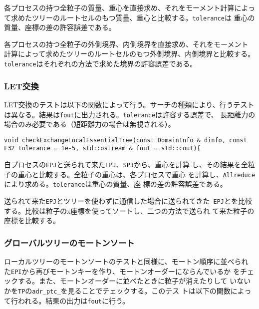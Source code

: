 各プロセスの持つ全粒子の質量、重心を直接求め、それをモーメント計算によっ
て求めたツリーのルートセルのもつ質量、重心と比較する。{\tt tolerance}は
重心の質量、座標の差の許容誤差である。



各プロセスの持つ全粒子の外側境界、内側境界を直接求め、それをモーメント
計算によって求めたツリーのルートセルのもつ外側境界、内側境界と比較する。
{\tt tolerance}はそれぞれの方法で求めた境界の許容誤差である。

\subsubsection{LET交換}

LET交換のテストは以下の関数によって行う。サーチの種類により、行うテスト
は異なる。結果は{\tt fout}に出力される。{\tt tolerance}は許容する誤差で、
長距離力の場合のみ必要である（短距離力の場合は無視される）。


\begin{screen}
\begin{verbatim}
void checkExchangeLocalEssentialTree(const DomainInfo & dinfo, const F32 tolerance = 1e-5, std::ostream & fout = std::cout){
\end{verbatim}
\end{screen}


自プロセスの{\tt EPJ}と送られて来た{\tt EPJ}、{\tt SPJ}から、重心を計算
し、その結果を全粒子の重心と比較する。全粒子の重心は、各プロセスで重心
を計算し、{\tt Allreduce}により求める。{\tt tolerance}は重心の質量、座
標の差の許容誤差である。



送られて来た{\tt EPJ}とツリーを使わずに通信した場合に送られてきた{\tt
EPJ}とを比較する。比較は粒子のx座標を使ってソートし、二つの方法で送られ
て来た粒子の座標を比較する。

\subsubsection{グローバルツリーのモートンソート}

ローカルツリーのモートンソートのテストと同様に、モートン順序に並べられ
た{\tt EPI}から再びモートンキーを作り、モートンオーダーにならんでいるか
をチェックする。また、モートンオーダーに並べたときに粒子が消えたりして
いないかを{\tt TP}の{\tt adr\_ptc\_}を見ることでチェックする。このテス
トは以下の関数によって行われる。結果の出力は{\tt fout}に行う。


